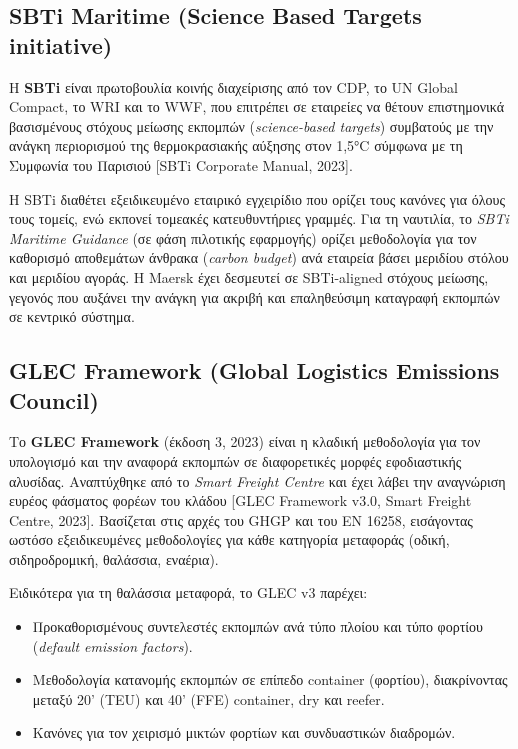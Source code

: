 \subsection{SBTi Maritime (Science Based Targets
initiative)}\label{sbti-maritime-science-based-targets-initiative}

Η \textbf{SBTi} είναι πρωτοβουλία κοινής διαχείρισης από τον CDP, το UN
Global Compact, το WRI και το WWF, που επιτρέπει σε εταιρείες να θέτουν
επιστημονικά βασισμένους στόχους μείωσης εκπομπών (\emph{science-based
targets}) συμβατούς με την ανάγκη περιορισμού της θερμοκρασιακής αύξησης
στον 1,5°C σύμφωνα με τη Συμφωνία του Παρισιού {[}SBTi Corporate Manual,
2023{]}.

Η SBTi διαθέτει εξειδικευμένο εταιρικό εγχειρίδιο που ορίζει τους
κανόνες για όλους τους τομείς, ενώ εκπονεί τομεακές κατευθυντήριες
γραμμές. Για τη ναυτιλία, το \emph{SBTi Maritime Guidance} (σε φάση
πιλοτικής εφαρμογής) ορίζει μεθοδολογία για τον καθορισμό αποθεμάτων
άνθρακα (\emph{carbon budget}) ανά εταιρεία βάσει μεριδίου στόλου και
μεριδίου αγοράς. Η Maersk έχει δεσμευτεί σε SBTi-aligned στόχους
μείωσης, γεγονός που αυξάνει την ανάγκη για ακριβή και επαληθεύσιμη
καταγραφή εκπομπών σε κεντρικό σύστημα.

\subsection{GLEC Framework (Global Logistics Emissions
Council)}\label{glec-framework-global-logistics-emissions-council}

Το \textbf{GLEC Framework} (έκδοση 3, 2023) είναι η κλαδική μεθοδολογία
για τον υπολογισμό και την αναφορά εκπομπών σε διαφορετικές μορφές
εφοδιαστικής αλυσίδας. Αναπτύχθηκε από το \emph{Smart Freight Centre}
και έχει λάβει την αναγνώριση ευρέος φάσματος φορέων του κλάδου {[}GLEC
Framework v3.0, Smart Freight Centre, 2023{]}. Βασίζεται στις αρχές του
GHGP και του EN 16258, εισάγοντας ωστόσο εξειδικευμένες μεθοδολογίες για
κάθε κατηγορία μεταφοράς (οδική, σιδηροδρομική, θαλάσσια, εναέρια).

Ειδικότερα για τη θαλάσσια μεταφορά, το GLEC v3 παρέχει:

\begin{itemize}
\tightlist
\item
  Προκαθορισμένους συντελεστές εκπομπών ανά τύπο πλοίου και τύπο φορτίου
  (\emph{default emission factors}).
\item
  Μεθοδολογία κατανομής εκπομπών σε επίπεδο container (φορτίου),
  διακρίνοντας μεταξύ 20' (TEU) και 40' (FFE) container, dry και reefer.
\item
  Κανόνες για τον χειρισμό μικτών φορτίων και συνδυαστικών διαδρομών.
\end{itemize}

